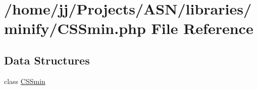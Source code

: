 \hypertarget{_c_s_smin_8php}{}\section{/home/jj/\+Projects/\+A\+S\+N/libraries/minify/\+C\+S\+Smin.php File Reference}
\label{_c_s_smin_8php}
\subsection*{Data Structures}
\begin{DoxyCompactItemize}
\item 
class \hyperlink{class_c_s_smin}{C\+S\+Smin}
\end{DoxyCompactItemize}
